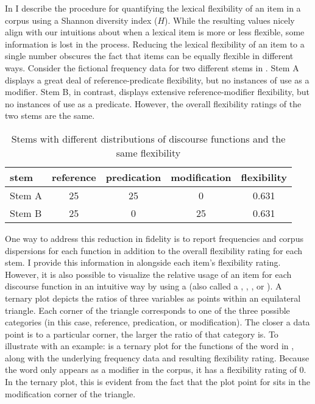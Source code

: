 In  I describe the procedure for quantifying the lexical flexibility of an item in a corpus using a Shannon diversity index ($H$). While the resulting values nicely align with our intuitions about when a lexical item is more or less flexible, some information is lost in the process. Reducing the lexical flexibility of an item to a single number obscures the fact that items can be equally flexible in different ways. Consider the fictional frequency data for two different stems in . Stem A displays a great deal of reference-predicate flexibility, but no instances of use as a modifier. Stem B, in contrast, displays extensive reference-modifier flexibility, but no instances of use as a predicate. However, the overall flexibility ratings of the two stems are the same.

\begin{table}[h!]
  \centering
  \caption{Stems with different distributions of discourse functions and the same flexibility}
  \label{tab:equal-flexibility-stems}
  \begin{tabular}{ l c c c c }
    \toprule
    stem   & reference & predication & modification & flexibility\\
    \midrule
    Stem A & 25        & 25          & 0            & 0.631      \\
    Stem B & 25        & 0           & 25           & 0.631      \\
    \bottomrule
  \end{tabular}
\end{table}

One way to address this reduction in fidelity is to report frequencies and corpus dispersions for each function in addition to the overall flexibility rating for each stem. I provide this information in  alongside each item's flexibility rating. However, it is also possible to visualize the relative usage of an item for each discourse function in an intuitive way by using a  (also called a , , , or ). A ternary plot depicts the ratios of three variables as points within an equilateral triangle. Each corner of the triangle corresponds to one of the three possible categories (in this case, reference, predication, or modification). The closer a data point is to a particular corner, the larger the ratio of that category is. To illustrate with an example:  is a ternary plot for the functions of the word  in , along with the underlying frequency data and resulting flexibility rating. Because the word  only appears as a modifier in the corpus, it has a flexibility rating of $0$. In the ternary plot, this is evident from the fact that the plot point for  sits in the modification corner of the triangle.

